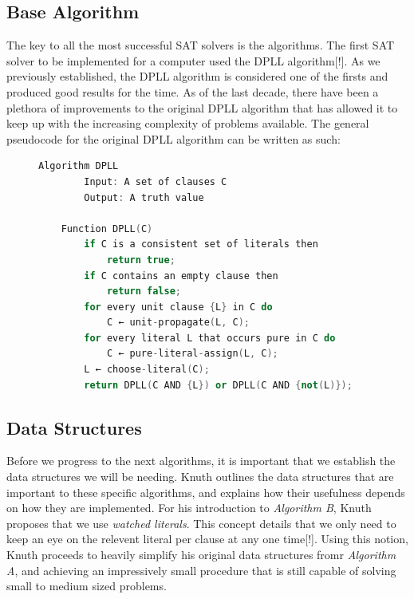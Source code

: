 \documentclass{article}
\begin{document}
\subsection{Base Algorithm}
The key to all the most successful SAT solvers is the algorithms. The first SAT solver to be implemented for a computer used the
DPLL algorithm[!]. As we previously established, the DPLL algorithm is considered one of the firsts and produced good results for
the time. As of the last decade, there have been a plethora of improvements to the original DPLL algorithm that has allowed it to
keep up with the increasing complexity of problems available. The general pseudocode for the original DPLL algorithm can be
written as such:

\begin{figure}[h]
\begin{lstlisting}[language=C++]
    Algorithm DPLL
        Input: A set of clauses C
        Output: A truth value

    Function DPLL(C)
        if C is a consistent set of literals then
            return true;
        if C contains an empty clause then
            return false;
        for every unit clause {L} in C do
            C ← unit-propagate(L, C);
        for every literal L that occurs pure in C do
            C ← pure-literal-assign(L, C);
        L ← choose-literal(C);
        return DPLL(C AND {L}) or DPLL(C AND {not(L)});
\end{lstlisting}
\end{figure}

\subsection{Data Structures}
Before we progress to the next algorithms, it is important that we establish the data structures we will be needing. Knuth
outlines the data structures that are important to these specific algorithms, and explains how their usefulness depends on how
they are implemented. For his introduction to \textit{Algorithm B}, Knuth proposes that we use \textit{watched literals}. This
concept details that we only need to keep an eye on the relevent literal per clause at any one time[!]. Using this notion, Knuth
proceeds to heavily simplify his original data structures fromr \textit{Algorithm A}, and achieving an impressively small
procedure that is still capable of solving small to medium sized problems. 
\end{document}
